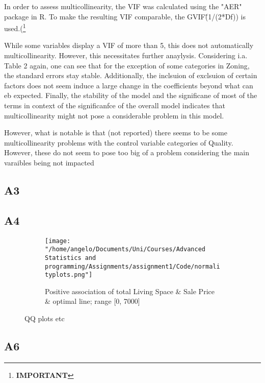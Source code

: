 \documentclass[a4paper]{article}
\begin{document}
In order to assess multicollinearity, the VIF was calculated using the "AER" package in R. To make the resulting VIF comparable, the GVIF\^(1/(2*Df)) is used.(\footnote{\textbf{IMPORTANT %
}}

While some variables display a VIF of more than 5, this does not automatically multicollinearity. However, this necessitates further anaylysis. Considering i.a. Table 2 again, one can see that for the exception of some categories in Zoning, the standard errors stay stable. Additionally, the inclsuion of exclsuion of certain factors does not seem induce a large change in the coefficients beyond what can eb expected. Finally, the stability of the model and the significane of most of the terms in context of the significanfce of the overall model indicates that multicollinearity might not pose a considerable problem in this model.

However, what is notable is that (not reported) there seems to be some multicollinearity problems with the control variable categories of Quality. However, these do not seem to pose too big of a problem considering the main varaibles being not impacted 

\subsection{A3}


\subsection{A4}
\begin{figure}
     \centering
     \begin{subfigure}[b]{0.45\textwidth}
         \centering
         \texttt{[image: "/home/angelo/Documents/Uni/Courses/Advanced Statistics and programming/Assignments/assignment1/Code/normalityplots.png"]}
         \small
         \caption{Positive association of total Living Space \& Sale Price \& optimal line; range [0, 7000]}
         \label{fig:y equals x}
     \end{subfigure}
     	\small
        \caption{QQ plots etc}
        \label{fig:three graphs}
\end{figure}


\subsection{A6}
\end{document}
